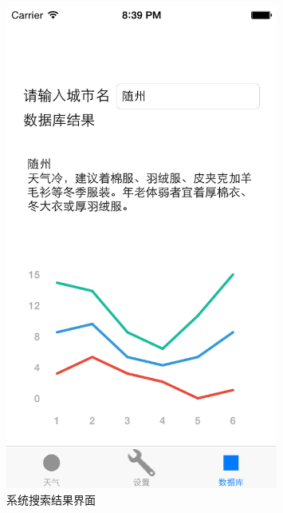 \documentclass[UTF8,nofonts]{ctexart}
\begin{document}
\begin{figure}[hbt]
\centering
\includegraphics[width=0.8\textwidth]{9.png}
\caption{系统搜索结果界面}
\end{figure}
\end{document}
